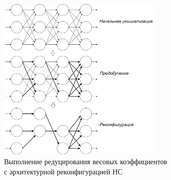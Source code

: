 \begin{figure}[H]
  \centering
  \includegraphics[width=0.7\textwidth]{man-source/images/ch2/pic2-3-1.png}
  \caption{Выполнение редуцирования весовых коэффициентов\\ с архитектурной реконфигурацией НС}
  \label{fig:pic2_3}
\end{figure}


	

